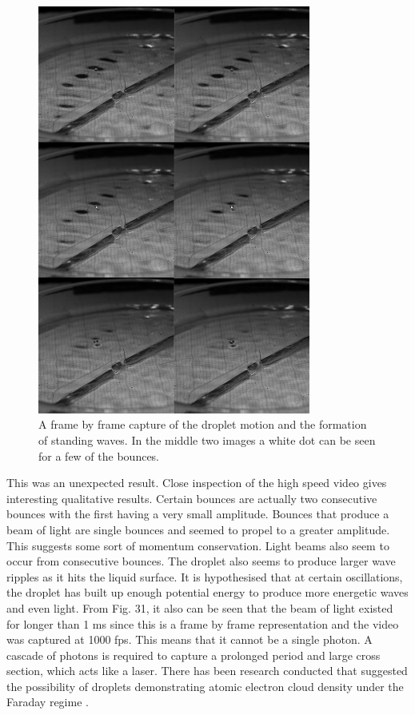 \begin{figure}[htb]
\includegraphics[width=0.8\textwidth]{prototype/exp_rep_imgs/strange_light.jpg}
\centering
\caption{A frame by frame capture of the droplet motion and the formation of standing waves. In the middle two images a white dot can be seen for a few of the bounces.}
\centering
\label{fig:strange_light}
\end{figure}

This was an unexpected result. Close inspection of the high speed video gives interesting qualitative results. Certain bounces are actually two consecutive bounces with the first having a very small amplitude. Bounces that produce a beam of light are single bounces and seemed to propel to a greater amplitude. This suggests some sort of momentum conservation. Light beams also seem to occur from consecutive bounces. The droplet also seems to produce larger wave ripples as it hits the liquid surface. It is hypothesised that at certain oscillations, the droplet has built up enough potential energy to produce more energetic waves and even light. From Fig. 31, it also can be seen that the beam of light existed for longer than 1 ms since this is a frame by frame representation and the video was captured at 1000 fps. This means that it cannot be a single photon. A cascade of photons is required to capture a prolonged period and large cross section, which acts like a laser. There has been research conducted that suggested the possibility of droplets demonstrating atomic electron cloud density under the Faraday regime \cite{oza2013trajectory}.

